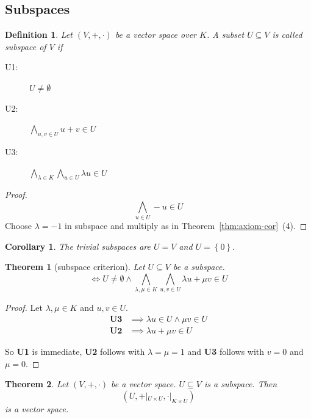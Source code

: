 \documentclass[a4paper,landscape,twocolumn]{article}
\newcommand\set[1]{\left\{#1\right\}}
\newtheorem{theorem}{Theorem}[section]
\newtheorem{defi}{Definition}[section]
\newtheorem{cor}{Corollary}[section]
\begin{document}
\subsection{Subspaces}

\begin{defi}
  Let $(V, +, \cdot)$ be a vector space over $K$.
  A subset $U \subseteq V$ is called \emph{subspace of $V$} if
  \begin{description}
    \item[U1:] $U \neq \emptyset$
    \item[U2:] $\bigwedge_{u,v \in U} u + v \in U$
    \item[U3:] $\bigwedge_{\lambda \in K} \bigwedge_{u \in U} \lambda u \in U$
  \end{description}
\end{defi}

\begin{proof}
  \[ \bigwedge_{u \in U} -u \in U \]
  Choose $\lambda = -1$ in subspace and multiply as in Theorem~\ref{thm:axiom-cor}~(4).
\end{proof}

\begin{cor}
  The \emph{trivial} subspaces are $U = V$ and $U = \set{0}$.
\end{cor}

\begin{theorem}[subspace criterion]
  \label{satz-3-3}
  Let $U \subseteq V$ be a subspace.
  \[ \iff U \neq \emptyset \land \bigwedge_{\lambda,\mu \in K} \bigwedge_{u,v \in U} \lambda u + \mu v \in U \]
\end{theorem}

\begin{proof}
  Let $\lambda, \mu \in K$ and $u,v \in U$.
  \begin{align*}
    \textbf{U3} &\implies \lambda u \in U \land \mu v \in U \\
    \textbf{U2} &\implies \lambda u + \mu v \in U
  \end{align*}

  So \textbf{U1} is immediate, \textbf{U2} follows with $\lambda = \mu = 1$ and \textbf{U3} follows with $v = 0$ and $\mu = 0$.
\end{proof}

\begin{theorem}
  Let $(V, +, \cdot)$ be a vector space. $U \subseteq V$ is a subspace.
  Then
  \[ \left(U, +|_{U \times U}, \cdot |_{K \times U}\right) \]
  is a vector space.
\end{theorem}
\end{document}
